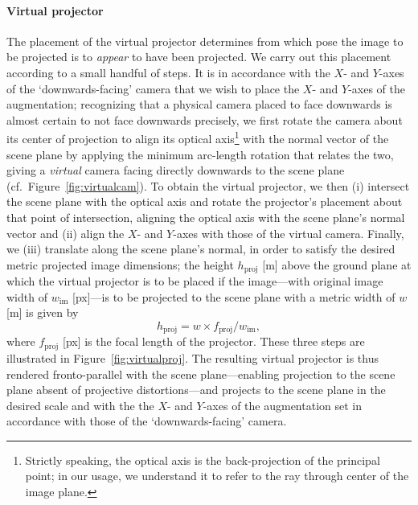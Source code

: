 \documentclass[review]{elsarticle}
\begin{document}
\paragraph{Virtual projector} The placement of the virtual projector determines from which pose the image to be projected is to \textit{appear} to have been projected.  We carry out this placement according to a small handful of steps. It is in accordance with the $X$- and $Y$-axes of the `downwards-facing' camera that we wish to place the $X$- and $Y$-axes of the augmentation; recognizing that a physical camera placed to face downwards is almost certain to not face downwards precisely, we first rotate the camera about its center of projection to align its optical axis\footnote{Strictly speaking, the optical axis is the back-projection of the principal point; in our usage, we understand it to refer to the ray through center of the image plane.} with the normal vector of the scene plane by applying the minimum arc-length rotation that relates the two, giving a \textit{virtual} camera facing directly downwards to the scene plane (cf.\ Figure~\ref{fig:virtualcam}). To obtain the virtual projector, we then (i) intersect the scene plane with the optical axis and rotate the projector's placement about that point of intersection, aligning the optical axis with the scene plane's normal vector and (ii) align the $X$- and $Y$-axes with those of the virtual camera. Finally, we (iii) translate along the scene plane's normal, in order to satisfy the desired metric projected image dimensions; the height $h_\text{proj}$ [m] above the ground plane at which the virtual projector is to be placed if the image---with original image width of $w_\text{im}$ [px]---is to be projected to the scene plane with a metric width of $w$ [m] is given by
\begin{equation}
h_\text{proj} = w \times f_\text{proj} / w_\text{im},
\end{equation}
where $f_\text{proj}$ [px] is the focal length of the projector. These three steps are illustrated in Figure~\ref{fig:virtualproj}. The resulting virtual projector is thus rendered fronto-parallel with the scene plane---enabling projection to the scene plane absent of projective distortions---and projects to the scene plane in the desired scale and with the the $X$- and $Y$-axes of the augmentation set in accordance with those of the `downwards-facing' camera. %
\end{document}
